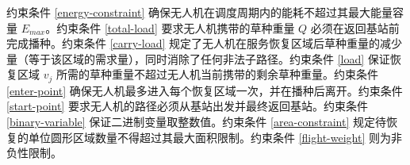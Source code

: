 \documentclass[AutoFakeBold]{LZUThesis}
\begin{document}


约束条件 \eqref{energy-constraint} 确保无人机在调度周期内的能耗不超过其最大能量容量 $E_{max}$。约束条件 \eqref{total-load} 要求无人机携带的草种重量 $Q$ 必须在返回基站前完成播种。约束条件 \eqref{carry-load} 规定了无人机在服务恢复区域后草种重量的减少量（等于该区域的需求量），同时消除了任何非法子路径。约束条件 \eqref{load} 保证恢复区域 $v_j$ 所需的草种重量不超过无人机当前携带的剩余草种重量。约束条件 \eqref{enter-point} 确保无人机最多进入每个恢复区域一次，并在播种后离开。约束条件 \eqref{start-point} 要求无人机的路径必须从基站出发并最终返回基站。约束条件 \eqref{binary-variable} 保证二进制变量取整数值。约束条件 \eqref{area-constraint} 规定待恢复的单位圆形区域数量不得超过其最大面积限制。约束条件 \eqref{flight-weight} 则为非负性限制。
\end{document}
